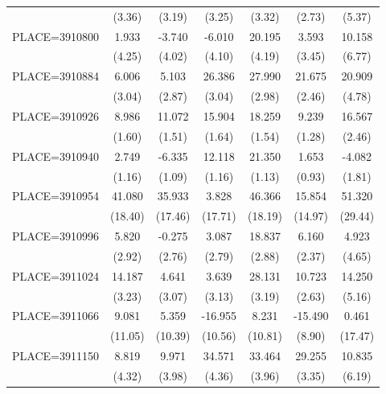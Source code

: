 {\begin{tabular}{l*{6}{c}}
                    &      (3.36)&      (3.19)&      (3.25)&      (3.32)&      (2.73)&      (5.37)\\
PLACE=3910800       &       1.933&      -3.740&      -6.010&      20.195&       3.593&      10.158\\
                    &      (4.25)&      (4.02)&      (4.10)&      (4.19)&      (3.45)&      (6.77)\\
PLACE=3910884       &       6.006&       5.103&      26.386&      27.990&      21.675&      20.909\\
                    &      (3.04)&      (2.87)&      (3.04)&      (2.98)&      (2.46)&      (4.78)\\
PLACE=3910926       &       8.986&      11.072&      15.904&      18.259&       9.239&      16.567\\
                    &      (1.60)&      (1.51)&      (1.64)&      (1.54)&      (1.28)&      (2.46)\\
PLACE=3910940       &       2.749&      -6.335&      12.118&      21.350&       1.653&      -4.082\\
                    &      (1.16)&      (1.09)&      (1.16)&      (1.13)&      (0.93)&      (1.81)\\
PLACE=3910954       &      41.080&      35.933&       3.828&      46.366&      15.854&      51.320\\
                    &     (18.40)&     (17.46)&     (17.71)&     (18.19)&     (14.97)&     (29.44)\\
PLACE=3910996       &       5.820&      -0.275&       3.087&      18.837&       6.160&       4.923\\
                    &      (2.92)&      (2.76)&      (2.79)&      (2.88)&      (2.37)&      (4.65)\\
PLACE=3911024       &      14.187&       4.641&       3.639&      28.131&      10.723&      14.250\\
                    &      (3.23)&      (3.07)&      (3.13)&      (3.19)&      (2.63)&      (5.16)\\
PLACE=3911066       &       9.081&       5.359&     -16.955&       8.231&     -15.490&       0.461\\
                    &     (11.05)&     (10.39)&     (10.56)&     (10.81)&      (8.90)&     (17.47)\\
PLACE=3911150       &       8.819&       9.971&      34.571&      33.464&      29.255&      10.835\\
                    &      (4.32)&      (3.98)&      (4.36)&      (3.96)&      (3.35)&      (6.19)\\

\end{tabular}}

